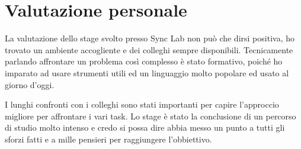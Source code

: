 \newpage
\section{Valutazione personale}
La valutazione dello stage svolto presso Sync Lab non può che dirsi positiva, ho trovato un ambiente accogliente e dei colleghi sempre disponibili. Tecnicamente parlando affrontare un problema così complesso è stato formativo, poiché ho imparato ad usare strumenti utili ed un linguaggio molto popolare ed usato al giorno d'oggi.

I lunghi confronti con i colleghi sono stati importanti per capire l'approccio migliore per affrontare i vari task.
Lo stage è stato la conclusione di un percorso di studio molto intenso e credo si possa dire abbia messo un punto a tutti gli sforzi fatti e a mille pensieri per raggiungere l'obbiettivo.